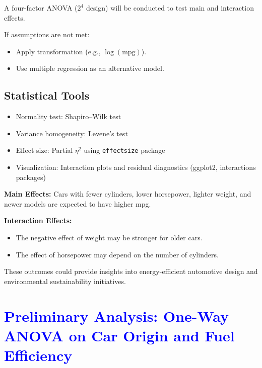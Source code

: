 \documentclass[12pt]{article}
\begin{document}
A four-factor ANOVA ($2^4$ design) will be conducted to test main and interaction effects. 

If assumptions are not met:
\begin{itemize}
    \item Apply transformation (e.g., $\log(\text{mpg})$).
    \item Use multiple regression as an alternative model.
\end{itemize}

\subsection{Statistical Tools}

\begin{itemize}
    \item Normality test: Shapiro–Wilk test
    \item Variance homogeneity: Levene’s test
    \item Effect size: Partial $\eta^2$ using \texttt{effectsize} package
    \item Visualization: Interaction plots and residual diagnostics (\textsf{ggplot2}, \textsf{interactions} packages)
\end{itemize}


\textbf{Main Effects:} Cars with fewer cylinders, lower horsepower, lighter weight, and newer models are expected to have higher mpg.

\textbf{Interaction Effects:}
\begin{itemize}
    \item The negative effect of weight may be stronger for older cars.
    \item The effect of horsepower may depend on the number of cylinders.
\end{itemize}

These outcomes could provide insights into energy-efficient automotive design and environmental sustainability initiatives.




\clearpage

\section{\textcolor{blue}{Preliminary Analysis: One-Way ANOVA on Car Origin and Fuel Efficiency}}

\end{document}
